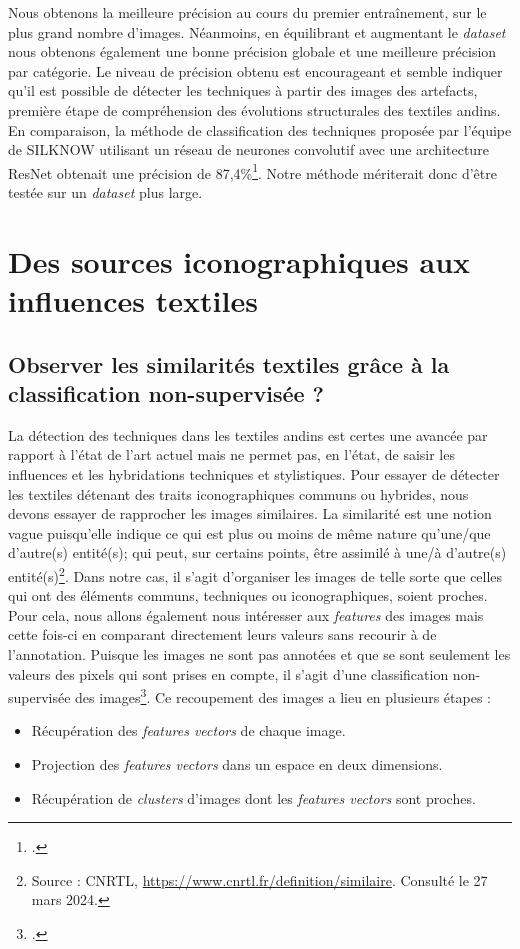 Nous obtenons la meilleure précision au cours du premier entraînement, sur le plus grand nombre d'images. Néanmoins, en équilibrant et augmentant le \textit{dataset} nous obtenons également une bonne précision globale et une meilleure précision par catégorie. Le niveau de précision obtenu est encourageant et semble indiquer qu'il est possible de détecter les techniques à partir des images des artefacts, première étape de compréhension des évolutions structurales des textiles andins. En comparaison, la méthode de classification des techniques proposée par l'équipe de SILKNOW utilisant un réseau de neurones convolutif avec une architecture ResNet obtenait une précision de 87,4\%\footcite[p.~53]{dorozynskiMultiTaskDeepLearning2019}.
Notre méthode mériterait donc d'être testée sur un \textit{dataset} plus large.




\section{Des sources iconographiques aux influences textiles}
\subsection{Observer les similarités textiles grâce à la classification non-supervisée ?}

La détection des techniques dans les textiles andins est certes une avancée par rapport à l'état de l'art actuel mais ne permet pas, en l'état, de saisir les influences et les hybridations techniques et stylistiques. Pour essayer de détecter les textiles détenant des traits iconographiques communs ou hybrides, nous devons essayer de rapprocher les images similaires. La similarité est une notion vague puisqu'elle indique ce \og qui est plus ou moins de même nature qu'une/que d'autre(s) entité(s); qui peut, sur certains points, être assimilé à une/à d'autre(s) entité(s)\fg\footnote{Source : CNRTL, \url{https://www.cnrtl.fr/definition/similaire}. Consulté le 27 mars 2024.}. Dans notre cas, il s'agit d'organiser les images de telle sorte que celles qui ont des éléments communs, techniques ou iconographiques, soient proches. Pour cela, nous allons également nous intéresser aux \textit{features} des images mais cette fois-ci en comparant directement leurs valeurs sans recourir à de l'annotation. Puisque les images ne sont pas annotées et que se sont seulement les valeurs des pixels qui sont prises en compte, il s'agit d'une classification non-supervisée des images\footcite[p.~439]{lecunDeepLearning2015}. Ce recoupement des images a lieu en plusieurs étapes : 
\begin{itemize}
	\item Récupération des \textit{features vectors} de chaque image.
	\item Projection des \textit{features vectors} dans un espace en deux dimensions.
	\item Récupération de \textit{clusters} d'images dont les \textit{features vectors} sont proches.\\
\end{itemize}

